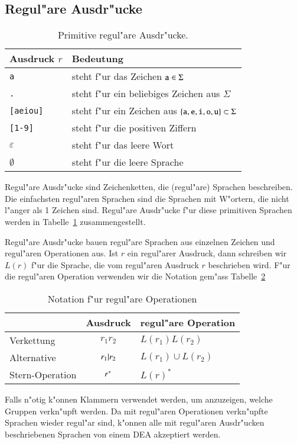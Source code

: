 \subsection{Regul"are Ausdr"ucke\label{regulaer:regulaere-ausdruecke}}
\begin{table}
\begin{center}
\begin{tabular}{|l|l|}
\hline
Ausdruck $r$&Bedeutung\\
\hline
{\tt a}&steht f"ur das Zeichen ${\tt a}\in \Sigma$\\
{\tt .}&steht f"ur ein beliebiges Zeichen aus $\Sigma$\\
{\tt [aeiou]}&steht f"ur ein Zeichen aus $\{{\tt a},{\tt e},{\tt i},{\tt o},{\tt u}\}\subset \Sigma$\\
{\tt [1-9]}&steht f"ur die positiven Ziffern\\
$\varepsilon$&steht f"ur das leere Wort\\
$\emptyset$&steht f"ur die leere Sprache\\
\hline
\end{tabular}
\end{center}
\caption{Primitive regul"are Ausdr"ucke.\label{regtab1}}
\end{table}
Regul"are Ausdr"ucke sind Zeichenketten, die (regul"are) Sprachen
beschreiben. 
Die einfachsten regul"aren Sprachen sind die Sprachen mit W"ortern,
die nicht l"anger als 1 Zeichen sind. Regul"are Ausdr"ucke f"ur
diese primitiven Sprachen werden in Tabelle~\ref{regtab1} zusammengestellt.

Regul"are Ausdr"ucke bauen regul"are Sprachen aus einzelnen
Zeichen und regul"aren Operationen aus.
Ist $r$ ein regul"arer Ausdruck, dann schreiben wir  $L(r)$ f"ur die
Sprache, die vom regul"aren Ausdruck $r$ beschrieben wird.
F"ur die regul"aren Operation verwenden wir die Notation
gem"ass Tabelle~\ref{regtab2}
\begin{table}
\begin{center}
\begin{tabular}{|l|c|l|}
\hline
&Ausdruck&regul"are Operation\\
\hline
\index{Verkettung}
Verkettung&$r_1r_2$&$L(r_1)L(r_2)$\\
\index{Alternative}
Alternative&$r_1{\tt |}r_2$&$L(r_1)\cup L(r_2)$\\
\index{*-Operation@$*$-Operation}
Stern-Operation&$r{\mathstrut^{\tt *}}$&$L(r)^*$\\
\hline
\end{tabular}
\end{center}
\caption{Notation f"ur regul"are Operationen\label{regtab2}}
\end{table}
Falls n"otig k"onnen Klammern verwendet werden, um anzuzeigen,
welche Gruppen verkn"upft werden. Da mit regul"aren Operationen
verkn"upfte Sprachen wieder regul"ar sind, k"onnen alle mit
regul"aren Ausdr"ucken beschriebenen Sprachen von einem DEA
akzeptiert werden.

